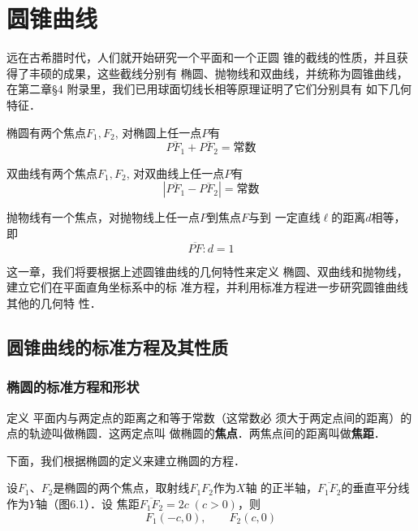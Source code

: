 \chapter{圆锥曲线}
远在古希腊时代，人们就开始研究一个平面和一个正圆
锥的截线的性质，并且获得了丰硕的成果，这些截线分别有
椭圆、抛物线和双曲线，并统称为圆锥曲线，在第二章§4
附录里，我们已用球面切线长相等原理证明了它们分别具有
如下几何特征．

椭圆有两个焦点$F_1,F_2$, 对椭圆上任一点$P$有
\[\overline{PF_1}+\overline{PF_2}=\text{常数}\]

双曲线有两个焦点$F_1,F_2$, 对双曲线上任一点$P$有
\[\left|\overline{PF_1}-\overline{PF_2}\right|=\text{常数}\]

抛物线有一个焦点，对抛物线上任一点$P$到焦点$F$与到
一定直线$\ell$的距离$d$相等，即
\[\overline{PF}:d=1\]

这一章，我们将要根据上述圆锥曲线的几何特性来定义
椭圆、双曲线和抛物线，建立它们在平面直角坐标系中的标
准方程，并利用标准方程进一步研究圆锥曲线其他的几何特
性．

\section{圆锥曲线的标准方程及其性质}
\subsection{椭圆的标准方程和形状}
\begin{blk}
    {定义} 平面内与两定点的距离之和等于常数（这常数必
须大于两定点间的距离）的点的轨迹叫做椭圆．这两定点叫
做椭圆的\textbf{焦点}．两焦点间的距离叫做\textbf{焦距}．
\end{blk}

下面，我们根据椭圆的定义来建立椭圆的方程．

设$F_1$、$F_2$是椭圆的两个焦点，取射线$F_1F_2$作为$X$轴
的正半轴，$\overline{F_1F_2}$的垂直平分线作为$Y$轴（图6.1）．设
焦距$\overline{F_1F_2}=2c\; (c>0)$，则
\[F_1(-c,0),\qquad F_2(c,0)\]

\begin{figure}[htp]
    \centering
    \caption{}
\end{figure}


